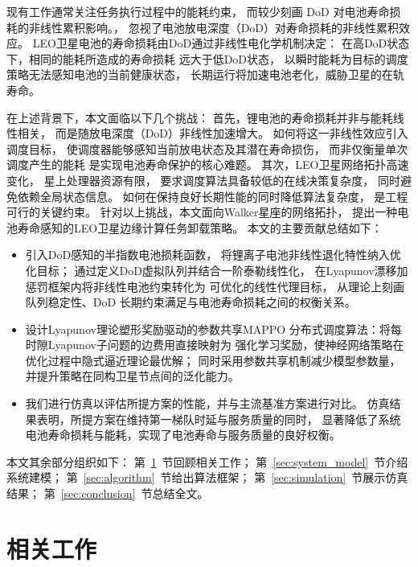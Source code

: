 \documentclass[a4paper,11pt]{article}
\begin{document}
现有工作通常关注任务执行过程中的能耗约束，
而较少刻画 DoD 对电池寿命损耗的非线性累积影响。\cite{3}，
忽视了电池放电深度（DoD）对寿命损耗的非线性累积效应。
LEO卫星电池的寿命损耗由DoD通过非线性电化学机制决定：
在高DoD状态下，相同的能耗所造成的寿命损耗
远大于低DoD状态\cite{4}，
以瞬时能耗为目标的调度策略无法感知电池的当前健康状态，
长期运行将加速电池老化，威胁卫星的在轨寿命\cite{5}。

在上述背景下，本文面临以下几个挑战：
首先，锂电池的寿命损耗并非与能耗线性相关，
而是随放电深度（DoD）非线性加速增大。
如何将这一非线性效应引入调度目标，
使调度器能够感知当前放电状态及其潜在寿命损伤，
而非仅衡量单次调度产生的能耗
是实现电池寿命保护的核心难题。
其次，LEO卫星网络拓扑高速变化，
星上处理器资源有限，
要求调度算法具备较低的在线决策复杂度，
同时避免依赖全局状态信息。
如何在保持良好长期性能的同时降低算法复杂度，
是工程可行的关键约束。
针对以上挑战，本文面向Walker星座的网络拓扑，
提出一种电池寿命感知的LEO卫星边缘计算任务卸载策略。
本文的主要贡献总结如下：
\begin{itemize}
    \item 引入DoD感知的半指数电池损耗函数，
    将锂离子电池非线性退化特性纳入优化目标；
    通过定义DoD虚拟队列并结合一阶泰勒线性化，
    在Lyapunov漂移加惩罚框架内将非线性电池约束转化为
    可优化的线性代理目标，
    从理论上刻画队列稳定性、DoD 长期约束满足与电池寿命损耗之间的权衡关系。

    \item 设计Lyapunov理论塑形奖励驱动的参数共享MAPPO
    分布式调度算法：将每时隙Lyapunov子问题的边费用直接映射为
    强化学习奖励，使神经网络策略在优化过程中隐式逼近理论最优解；
    同时采用参数共享机制减少模型参数量，并提升策略在同构卫星节点间的泛化能力。

    \item 我们进行仿真以评估所提方案的性能，并与主流基准方案进行对比。
    仿真结果表明，所提方案在维持第一梯队时延与服务质量的同时，
    显著降低了系统电池寿命损耗与能耗，实现了电池寿命与服务质量的良好权衡。
\end{itemize}

本文其余部分组织如下：
第~\ref{sec:related}~节回顾相关工作；
第~\ref{sec:system_model}~节介绍系统建模；
第~\ref{sec:algorithm}~节给出算法框架；
第~\ref{sec:simulation}~节展示仿真结果；
第~\ref{sec:conclusion}~节总结全文。

\section{相关工作}
\label{sec:related}
\end{document}
